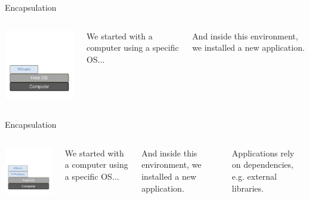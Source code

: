 \begin{frame}{Encapsulation}
\begin{columns}

\includegraphics[width=6cm]{02_encapsulation/figures/intro_encapsulation_v2-1.pdf}

We started with a computer using a specific OS...


And inside this environment, we installed a new application.
\end{columns}
\end{frame}

\begin{frame}{Encapsulation}
\begin{columns}

\includegraphics[width=6cm]{02_encapsulation/figures/intro_encapsulation_v2-2.pdf}

We started with a computer using a specific OS...


And inside this environment, we installed a new application.


Applications rely on dependencies, e.g. external libraries.

\end{columns}
\end{frame}


